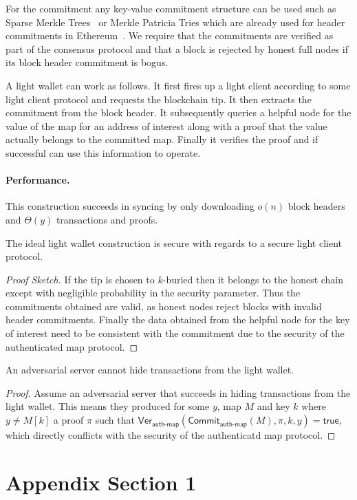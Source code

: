 \documentclass[sigconf,authordraft]{acmart}
\begin{document}
For the commitment any key-value commitment structure can be used such as Sparse Merkle Trees~\cite{sparse-mt,revocation-transparency} or Merkle Patricia Tries which are already used for header commitments in Ethereum~\cite{wood2014ethereum}. We require that the commitments are verified as part of the consensus protocol and that a block is rejected by honest full nodes if its block header commitment is bogus.

A light wallet can work as follows. It first fires up a light client according to some light client protocol and requests the blockchain tip. It then extracts the commitment from the block header. It subsequently queries a helpful node for the value of the map for an address of interest along with a proof that the value actually belongs to the committed map. Finally it verifies the proof and if successful can use this information to operate.

\paragraph{Performance.} This construction succeeds in syncing by only downloading $o(n)$ block headers and $\Theta(y)$ transactions and proofs.
\begin{theorem}
The ideal light wallet construction is secure with regards to a secure light client protocol.
\end{theorem}
\begin{proof}[Proof Sketch]
If the tip is chosen to $k$-buried then it belongs to the honest chain except with negligible probability in the security parameter. Thus the commitments obtained are valid, as honest nodes reject blocks with invalid header commitments. Finally the data obtained from the helpful node for the key of interest need to be consistent with the commitment due to the security of the authenticated map protocol.
\end{proof}

\begin{theorem}
An adversarial server cannot hide transactions from the light wallet.
\end{theorem}
\begin{proof}
Assume an adversarial server that succeeds in hiding transactions from the light wallet. This means they produced for some $y$, map $M$ and key $k$ where $y \neq M[k]$ a proof $\pi$ such that $\textsf{Ver}_\textsf{auth-map}(\textsf{Commit}_\textsf{auth-map}(M), \pi, k, y) = \textsf{true}$, which directly conflicts with the security of the authenticatd map protocol.
\end{proof}

\begin{acks}
\end{acks}




\appendix

\section{Appendix Section 1}
\end{document}
